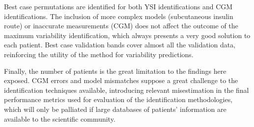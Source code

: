 Best case permutations are identified for both YSI identifications and CGM identifications. The inclusion of more complex models (subcutaneous insulin route) or inaccurate measurements (CGM) does not affect the outcome of the maximum variability identification, which always presents a very good solution to each patient. Best case validation bands cover almost all the validation data, reinforcing the utility of the method for variability predictions.

Finally, the number of patients is the great limitation to the findings here exposed. CGM errors and model mismatches suppose a great challenge to the identification techniques available, introducing relevant misestimation in the final performance metrics used for evaluation of the identification methodologies, which will only be palliated if large databases of patients' information are available to the scientific community.






